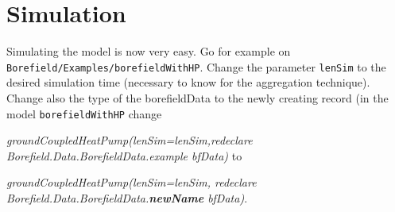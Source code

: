 \documentclass[a4paper,oneside,11pt]{report}
\begin{document}
\section{Simulation}
Simulating the model is now very easy. Go for example on {\tt Borefield/Examples/borefieldWithHP}. Change the parameter {\tt lenSim} to the desired simulation time (necessary to know for the aggregation technique). Change also the type of the borefieldData to the newly creating record (in the model {\tt borefieldWithHP} change 

\textit{groundCoupledHeatPump(lenSim=lenSim,redeclare Borefield.Data.BorefieldData.example bfData)} to 

\textit{ groundCoupledHeatPump(lenSim=lenSim, redeclare Borefield.Data.BorefieldData.\textbf{newName} bfData)}.
\end{document}
